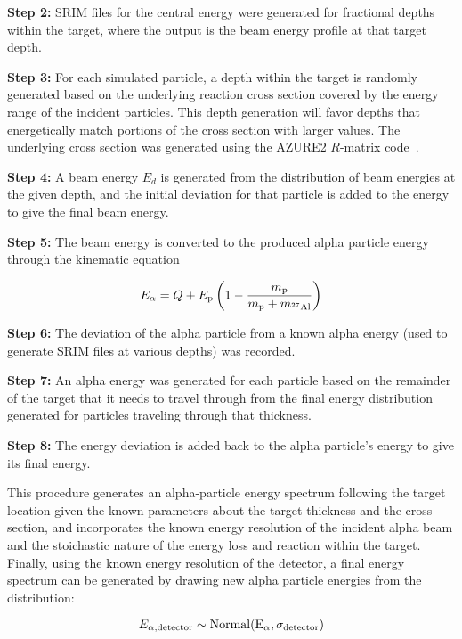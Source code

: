 \textbf{Step 2:}
  SRIM files for the central energy were generated for fractional depths
  within the target, where the output is the beam energy profile at that
  target depth.

\textbf{Step 3:}
  For each simulated particle, a depth within the target is randomly generated
  based on the underlying reaction cross section covered by the energy range of
  the incident particles. This depth generation will favor depths that
  energetically match portions of the cross section with larger values. The
  underlying cross section was generated using the AZURE2 $R$-matrix
  code~\cite{AZURE2, deBoer2017}.

\textbf{Step 4:}
  A beam energy $E_d$ is generated from the distribution of beam energies
  at the given depth, and the initial deviation for that particle is
  added to the energy to give the final beam energy.

\textbf{Step 5:}
  The beam energy is converted to the produced alpha particle energy
  through the kinematic equation

\begin{equation}
    E_{\alpha} = Q + E_{\rm p}\left(
        1 - \frac{m_{\rm p}}{m_{\rm p} + m_{{}^{27}\rm{Al}}} %
    \right)
\end{equation}


\textbf{Step 6:}
  The deviation of the alpha particle from a known alpha energy (used to
  generate SRIM files at various depths) was recorded.

\textbf{Step 7:}
  An alpha energy was generated for each particle based on the remainder
  of the target that it needs to travel through from the final energy
  distribution generated for particles traveling through that thickness.

\textbf{Step 8:}
  The energy deviation is added back to the alpha particle's energy to
  give its final energy.

This procedure generates an alpha-particle energy spectrum following the
target location given the known parameters about the target thickness
and the cross section, and incorporates the known energy resolution of
the incident alpha beam and the stoichastic nature of the energy loss
and reaction within the target. Finally, using the known energy
resolution of the detector, a final energy spectrum can be generated by
drawing new alpha particle energies from the distribution:

\begin{equation}
    E_{\alpha,\rm{detector}} \sim \rm{Normal}(E_{\alpha},\sigma_{\rm detector})
\end{equation}

